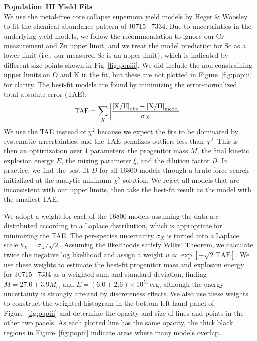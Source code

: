 \documentclass{natureprintstyle}
\newcommand{\umpstar}{J0715$-$7334\xspace}
\begin{document}
\vspace{1mm}
\noindent
{\bf Population~III Yield Fits}
\\
\noindent
We use the metal-free core collapse supernova yield models by Heger \& Woosley\cite{Heger2010} to fit the chemical abundance pattern of \umpstar.
Due to uncertainties in the underlying yield models, we follow the recommendation to ignore our Cr measurement and Zn upper limit, and we treat the model prediction for Sc as a lower limit (i.e., our measured Sc is an upper limit), which is indicated by different size points shown in Fig~\ref{fig:popiii}.
We did include the non-constraining upper limits on O and K in the fit, but these are not plotted in Figure~\ref{fig:popiii} for clarity.
The best-fit models are found by minimizing the error-normalized total absolute error (TAE)\cite{Ji2024}:
\begin{equation*}
    \text{TAE} = \sum_X \left| \frac{\text{[X/H]}_{\rm obs} - \text{[X/H]}_{\rm model}}{\sigma_X}\right|
\end{equation*}
We use the TAE instead of $\chi^2$ because we expect the fits to be dominated by systematic uncertainties, and the TAE penalizes outliers less than $\chi^2$.
This is then an optimization over 4 parameters: the progenitor mass $M$, the final kinetic explosion energy $E$, the mixing parameter $\xi$, and the dilution factor $D$. In practice, we find the best-fit $D$ for all 16800 models through a brute force search initialized at the analytic minimum $\chi^2$ solution. We reject all models that are inconsistent with our upper limits, then take the best-fit result as the model with the smallest TAE.

We adopt a weight for each of the 16800 models assuming the data are distributed according to a Laplace distribution, which is appropriate for minimizing the TAE. The per-species uncertainty $\sigma_X$ is turned into a Laplace scale $b_X=\sigma_X/\sqrt{2}$. Assuming the likelihoods satisfy Wilks' Theorem\cite{Wilks1938}, we calculate twice the negative log likelihood and assign a weight $w \propto \exp\left[-\sqrt{2}\, \text{TAE} \right]$.
We use these weights to estimate the best-fit progenitor mass and explosion energy for \umpstar as a weighted sum and standard deviation, finding $M = 27.0 \pm 3.9 M_\odot$ and $E = (6.0 \pm 2.6) \times 10^{51}$\,erg, although the energy uncertainty is strongly affected by discreteness effects.
We also use these weights to construct the weighted histogram in the bottom left-hand panel of Figure~\ref{fig:popiii} and determine the opacity and size of lines and points in the other two panels. As each plotted line has the same opacity, the thick black regions in Figure~\ref{fig:popiii} indicate areas where many models overlap.
\end{document}

